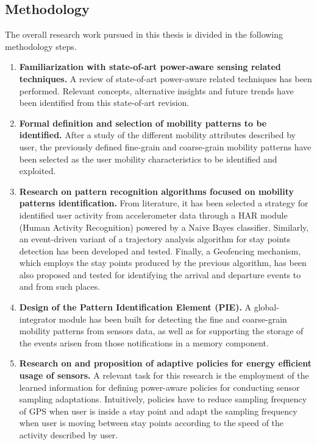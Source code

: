 \documentclass[ENG,PhD]{cinvestav}
\begin{document}
\subsection{Methodology}
The overall research work pursued in this thesis is divided in the following methodology steps.
\begin{enumerate}
  \item \textbf{Familiarization with state-of-art power-aware sensing related techniques.}
  A review of state-of-art power-aware related techniques has been performed.
  Relevant concepts, alternative insights and future trends have been identified from this state-of-art revision.
  
  \item \textbf{Formal definition and selection of mobility patterns to be identified.}
  After a study of the different mobility attributes described by user, the previously defined fine-grain and coarse-grain mobility patterns have been selected as the user mobility characteristics to be identified and exploited.

  \item \textbf{Research on pattern recognition algorithms focused on mobility patterns identification.}
  From literature, it has been selected a strategy for identified user activity from accelerometer data through a HAR module (Human Activity Recognition) powered by a Naive Bayes classifier.
  Similarly, an event-driven variant of a trajectory analysis algorithm for stay points detection has been developed and tested.
  Finally, a Geofencing mechanism, which employs the stay points produced by the previous algorithm, has been also proposed and tested for identifying the arrival and departure events to and from such places.
  
  \item \textbf{Design of the Pattern Identification Element (PIE).}
  A global-integrator module has been built for detecting the fine and coarse-grain mobility patterns from sensors data, as well as for supporting the storage of the events arisen from those notifications in a memory component.
  

  \item \textbf{Research on and proposition of adaptive policies for energy efficient usage of sensors.}
  A relevant task for this research is the employment of the learned information for defining power-aware policies for conducting sensor sampling adaptations.
  Intuitively, policies have to reduce sampling frequency of GPS when user is inside a stay point and adapt the sampling frequency when user is moving between stay points according to the speed of the activity described by user.
    


\end{enumerate}
\end{document}
